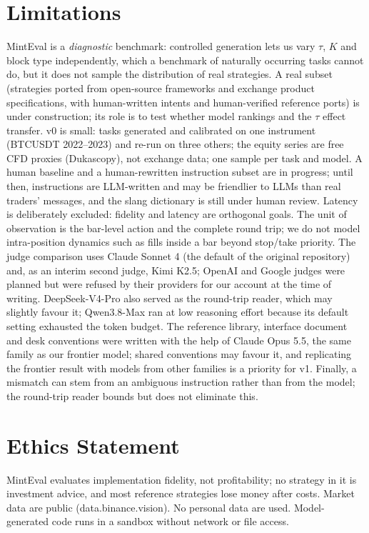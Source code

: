 \documentclass[sigconf,anonymous,review]{acmart}
\begin{document}
\section{Limitations}\label{sec:limits}
MintEval is a \emph{diagnostic} benchmark: controlled generation lets us vary $\tau$, $K$ and block
type independently, which a benchmark of naturally occurring tasks cannot do, but it does not
sample the distribution of real strategies. A real subset (strategies ported from open-source
frameworks and exchange product specifications, with human-written intents and human-verified
reference ports) is under construction; its role is to test whether model rankings and the $\tau$
effect transfer. v0 is small: \NTasks{} tasks generated and calibrated on one instrument (BTCUSDT 2022--2023) and
re-run on three others; the equity series are free CFD proxies (Dukascopy), not exchange data; one
sample per task and model. A human baseline and a human-rewritten instruction subset are in progress; until
then, instructions are LLM-written and may be friendlier to LLMs than real traders' messages, and
the slang dictionary is still under human review. Latency is deliberately excluded: fidelity and
latency are orthogonal goals. The unit of observation is the bar-level action and the complete
round trip; we do not model intra-position dynamics such as fills inside a bar beyond stop/take
priority. The judge comparison uses Claude Sonnet 4 (the default of the original repository) and, as an
interim second judge, Kimi K2.5; OpenAI and Google judges were planned but were refused by their
providers for our account at the time of writing. DeepSeek-V4-Pro also served as the round-trip
reader, which may slightly favour it; Qwen3.8-Max ran at low reasoning effort because its default
setting exhausted the token budget. The reference library, interface document and desk conventions were written with the help of
Claude Opus 5.5, the same family as our frontier model; shared conventions may favour it, and
replicating the frontier result with models from other families is a priority for v1. Finally, a mismatch can stem from an ambiguous instruction rather than from the model;
the round-trip reader bounds but does not eliminate this.

\section*{Ethics Statement}
MintEval evaluates implementation fidelity, not profitability; no strategy in it is
investment advice, and most reference strategies lose money after costs. Market data are public
(data.binance.vision). No personal data are used. Model-generated code runs in a sandbox
without network or file access.
\end{document}
